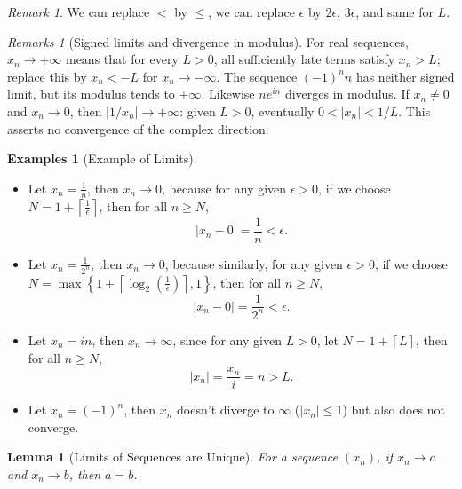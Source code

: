 \documentclass[11pt]{article}
\numberwithin{equation}{section}
\newtheorem{lemma}[theorem]{Lemma}
\theoremstyle{definition}
\newtheorem{examples}[theorem]{Examples}
\theoremstyle{remark}
\newtheorem{remark}[theorem]{Remark}
\newtheorem{remarks}[theorem]{Remarks}
\newcommand{\pqty}[1]{\left(#1\right)}
\newcommand{\Bqty}[1]{\left\{#1\right\}}
\newcommand{\abs}[1]{\left|#1\right|}
\newcommand{\ceil}[1]{\left\lceil#1\right\rceil}
\begin{document}
\begin{remark}\label{analysis-unit-0004}
    We can replace \(<\) by \(\leq\), we can replace \(\epsilon\) by \(2 \epsilon\), \(3 \epsilon\), and same for \(L\).
\end{remark}

\begin{remarks}[Signed limits and divergence in modulus]\label{analysis-unit-0005}
For real sequences, \(x_n\to+\infty\) means that for every \(L>0\),
all sufficiently late terms satisfy \(x_n>L\); replace this by \(x_n<-L\)
for \(x_n\to-\infty\). The sequence \((-1)^n n\) has neither signed limit,
but its modulus tends to \(+\infty\). Likewise \(n e^{in}\) diverges in modulus.
If \(x_n\ne0\) and \(x_n\to0\), then \(|1/x_n|\to+\infty\): given \(L>0\),
eventually \(0<|x_n|<1/L\). This asserts no convergence of the complex direction.
\end{remarks}

\begin{examples}[Example of Limits]\label{analysis-unit-0006}
    \label{ex:seq-limits}
    \begin{itemize}
        \item Let \(x_n = \frac{1}{n}\), then \(x_n \to 0\), because for any given \(\epsilon > 0\), if we choose \(N = 1 + \ceil{\frac{1}{\epsilon}}\), then for all \(n \geq N\),
        \[
            \abs{x_n - 0} = \frac{1}{n} < \epsilon.
        \]

        \item Let \(x_n = \frac{1}{2^n}\), then \(x_n \to 0\), because similarly, for any given \(\epsilon > 0\), if we choose \(N = \max\Bqty{1 + \ceil{\log_2 \pqty{\frac{1}{\epsilon}}}, 1}\), then for all \(n \geq N\),
        \[
            \abs{x_n - 0} = \frac{1}{2^n} < \epsilon.
        \]

        \item Let \(x_n = in\), then \(x_n \to \infty\), since for any given \(L > 0\), let \(N = 1 + \ceil{L}\), then for all \(n \geq N\),
        \[
            \abs{x_n} = \frac{x_n}{i} = n > L.
        \]

        \item Let \(x_n = \pqty{-1}^n\), then \(x_n\) doesn't diverge to \(\infty\) (\(\abs{x_n} \leq 1\)) but also does not converge.
    \end{itemize}
\end{examples}

\begin{lemma}[Limits of Sequences are Unique]\label{analysis-unit-0007}
    \label{lem:seq-limit-unique}%
    For a sequence \(\pqty{x_n}\), if \(x_n \to a\) and \(x_n \to b\), then \(a = b\).
\end{lemma}
\end{document}
